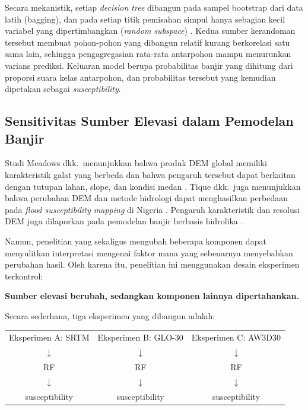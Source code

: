 \documentclass[12pt]{article}
\begin{document}
Secara mekanistik, setiap \textit{decision tree} dibangun pada sampel
bootstrap dari data latih (bagging), dan pada setiap titik pemisahan
simpul hanya sebagian kecil variabel yang dipertimbangkan (\textit{random
subspace}) \cite{breiman2001}. Kedua sumber kerandoman tersebut membuat
pohon-pohon yang dibangun relatif kurang berkorelasi satu sama lain, sehingga
pengagregasian rata-rata antarpohon mampu menurunkan varians prediksi.
Keluaran model berupa probabilitas banjir yang dihitung dari proporsi
suara kelas antarpohon, dan probabilitas tersebut yang kemudian dipetakan
sebagai \textit{susceptibility}.

\subsection{Sensitivitas Sumber Elevasi dalam Pemodelan Banjir}

Studi Meadows dkk.\ menunjukkan bahwa produk DEM global memiliki
karakteristik galat yang berbeda dan bahwa pengaruh tersebut dapat berkaitan
dengan tutupan lahan, slope, dan kondisi medan \cite{meadows2024}. Tique
dkk.\ juga menunjukkan bahwa perubahan DEM dan metode hidrologi dapat
menghasilkan perbedaan pada \textit{flood susceptibility mapping} di Nigeria
\cite{Tique2026}. Pengaruh karakteristik dan resolusi DEM juga dilaporkan pada pemodelan banjir
berbasis hidrolika \cite{fatdillah2022,fikri2026}.

Namun, penelitian yang sekaligus mengubah beberapa komponen dapat
menyulitkan interpretasi mengenai faktor mana yang sebenarnya menyebabkan
perubahan hasil. Oleh karena itu, penelitian ini menggunakan desain
eksperimen terkontrol:

\begin{center}
\textbf{Sumber elevasi berubah, sedangkan komponen lainnya dipertahankan.}
\end{center}

Secara sederhana, tiga eksperimen yang dibangun adalah:

\begin{center}
\begin{tabular}{ccc}
Eksperimen A: SRTM & Eksperimen B: GLO-30 & Eksperimen C: AW3D30 \\
$\downarrow$ & $\downarrow$ & $\downarrow$ \\
RF & RF & RF \\
$\downarrow$ & $\downarrow$ & $\downarrow$ \\
susceptibility & susceptibility & susceptibility \\
\end{tabular}
\end{center}
\end{document}
